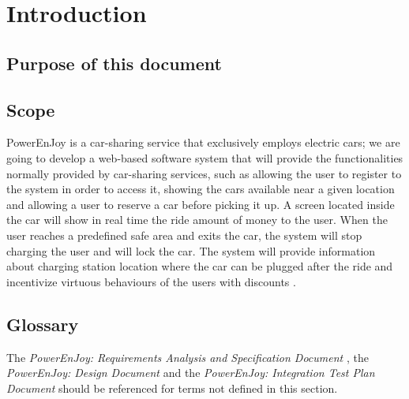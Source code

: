 \section{Introduction}

\subsection{Purpose of this document}

\subsection{Scope}
PowerEnJoy is a car-sharing service that exclusively employs electric cars; we are going to develop a web-based software system that will provide the functionalities normally provided by car-sharing services, such as allowing the user to register to the system in order to access it, showing the cars available near a given location and allowing a user to reserve a car before picking it up.
A screen located inside the car will show in real time the ride amount of money to the user. When the user reaches a predefined safe area and exits the car, the system will stop charging the user and will lock the car. The system will provide information about charging station location where the car can be plugged after the ride and incentivize virtuous behaviours of the users with discounts \cite{RASD}.

\subsection{Glossary}
The \emph{PowerEnJoy: Requirements Analysis and Specification Document} \cite{RASD}, the \emph{PowerEnJoy: Design Document} \cite{DD} and the \emph{PowerEnJoy: Integration Test Plan Document} \cite{ITPD} should be referenced for terms not defined in this section.


